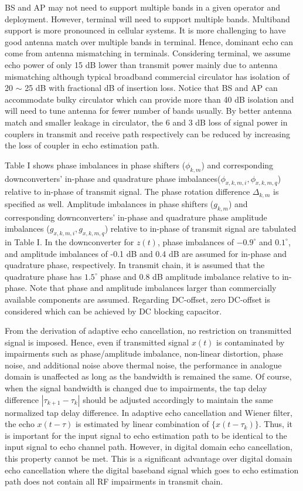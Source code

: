 \documentclass[twocolumn]{IEEEtran}
\begin{document}
BS and AP may not need to support multiple bands in a given operator
and deployment. However, terminal will need to support multiple
bands. Multiband support is more pronounced in cellular systems. It
is more challenging to have good antenna match over multiple bands
in terminal. Hence, dominant echo can come from antenna mismatching
in terminals. Considering terminal, we assume echo power of only 15
dB lower than transmit power mainly due to antenna mismatching
although typical broadband commercial circulator has isolation of 20
$\sim$ 25 dB with fractional dB of insertion loss. Notice that BS
and AP can accommodate bulky circulator which can provide more than
40 dB isolation and will need to tune antenna for fewer number of
bands usually. By better antenna match and smaller leakage in
circulator, the 6 and 3 dB loss of signal power in couplers in
transmit and receive path respectively can be reduced by increasing
the loss of coupler in echo estimation path.

Table I shows phase imbalances in phase shifters ($\phi_{k,m}$) and
corresponding downconverters' in-phase and quadrature phase
imbalances($\phi_{x,k,m,i},\phi_{x,k,m,q}$) relative to in-phase of
transmit signal. The phase rotation difference $\Delta_{k,m}$ is
specified as well. Amplitude imbalances in phase shifters
($g_{k,m}$) and corresponding downconverters' in-phase and
quadrature phase amplitude imbalances ($g_{x,k,m,i},g_{x,k,m,q}$)
relative to in-phase of transmit signal are tabulated in Table I. In
the downconverter for $z(t)$, phase imbalances of $-0.9^\circ$ and
$0.1^\circ$, and amplitude imbalances of -0.1 dB and 0.4 dB are
assumed for in-phase and quadrature phase, respectively. In transmit
chain, it is assumed that the quadrature phase has $1.5^\circ$ phase
and 0.8 dB amplitude imbalance relative to in-phase. Note that phase
and amplitude imbalances larger than commercially available
components are assumed. Regarding DC-offset, zero DC-offset is
considered which can be achieved by DC blocking capacitor.

From the derivation of adaptive echo cancellation, no restriction on
transmitted signal is imposed. Hence, even if transmitted signal
$x(t)$ is contaminated by impairments such as phase/amplitude
imbalance, non-linear distortion, phase noise, and additional noise
above thermal noise, the performance in analogue domain is
unaffected as long as the bandwidth is remained the same. Of course,
when the signal bandwidth is changed due to impairments, the tap
delay difference $|\tau_{k+1}-\tau_k|$ should be adjusted
accordingly to maintain the same normalized tap delay difference. In
adaptive echo cancellation and Wiener filter, the echo $x(t-\tau)$
is estimated by linear combination of $\{x(t-\tau_k)\}$. Thus, it is
important for the input signal to echo estimation path to be
identical to the input signal to echo channel path. However, in
digital domain echo cancellation, this property cannot be met. This
is a significant advantage over digital domain echo cancellation
where the digital baseband signal which goes to echo estimation path
does not contain all RF impairments in transmit chain.
\end{document}
